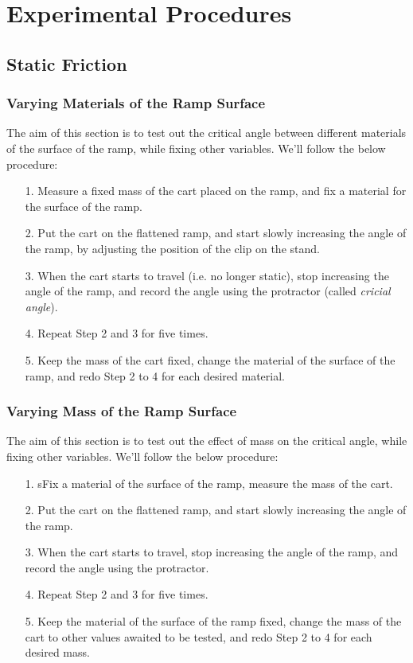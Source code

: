 \documentclass{article}
\begin{document}
\section{Experimental Procedures}

\subsection{Static Friction}
\subsubsection{Varying Materials of the Ramp Surface}
The aim of this section is to test out the critical angle between different materials of the surface of the ramp, while fixing other variables. We'll follow the below procedure:
\begin{itemize}
    \item[1.] Measure a fixed mass of the cart placed on the ramp, and fix a material for the surface of the ramp.
    \item[2.] Put the cart on the flattened ramp, and start slowly increasing the angle of the ramp, by adjusting the position of the clip on the stand.
    \item[3.] When the cart starts to travel (i.e. no longer static), stop increasing the angle of the ramp, and record the angle using the protractor (called \emph{cricial angle}).
    \item[4.] Repeat Step 2 and 3 for five times.
    \item[5.] Keep the mass of the cart fixed, change the material of the surface of the ramp, and redo Step 2 to 4 for each desired material. 
\end{itemize}

\subsubsection{Varying Mass of the Ramp Surface}
The aim of this section is to test out the effect of mass on the critical angle, while fixing other variables. We'll follow the below procedure:
\begin{itemize}
    \item[1.] sFix a material of the surface of the ramp, measure the mass of the cart.
    \item[2.] Put the cart on the flattened ramp, and start slowly increasing the angle of the ramp. 
    \item[3.] When the cart starts to travel, stop increasing the angle of the ramp, and record the angle using the protractor.
    \item[4.] Repeat Step 2 and 3 for five times.
    \item[5.] Keep the material of the surface of the ramp fixed, change the mass of the cart to other values awaited to be tested, and redo Step 2 to 4 for each desired mass.  
\end{itemize}
\end{document}

